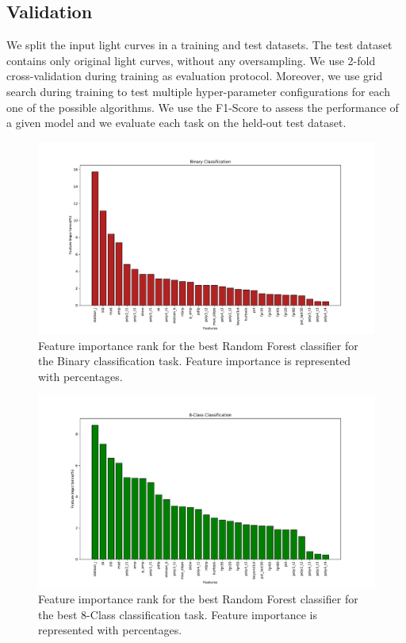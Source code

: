 \documentclass[a4paper,fleqn,usenatbib]{mnras}
\begin{document}
\subsection{Validation} \label{subsection_importances}

We split the input light curves in a training and test datasets. 
The test dataset contains only original light curves, without any
oversampling. 
We use 2-fold cross-validation during training as evaluation
protocol. 
Moreover, we use grid search during training to test multiple
hyper-parameter configurations for each one  of the possible
algorithms. 
We use the F1-Score to assess the performance of a given model and 
we evaluate each task on the held-out test dataset.


\begin{figure}
	\includegraphics[width=\textwidth]{figures/Binary/binFeatImportance.pdf}
    \caption{Feature importance rank  for the best Random Forest
      classifier for the Binary classification task. 
      Feature importance is represented with percentages.} 
    \label{Importances-Binary}
\end{figure} 

\begin{figure}
	\includegraphics[width=\textwidth]{figures/8-Class/8classFeatImportance.pdf}
    \caption{Feature importance rank for the best Random Forest
      classifier for the best 8-Class classification task. Feature
      importance is represented with percentages.} 
    \label{Importances-8-Class}
\end{figure}
\end{document}
